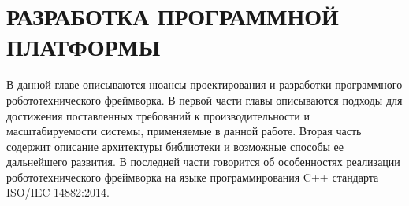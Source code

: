 \chapter{РАЗРАБОТКА ПРОГРАММНОЙ ПЛАТФОРМЫ}

В данной главе описываются нюансы проектирования и разработки программного робототехнического фреймворка. В первой части главы описываются подходы для достижения поставленных требований к производительности и масштабируемости системы, применяемые в данной работе. Вторая часть содержит описание архитектуры библиотеки и возможные способы ее дальнейшего развития. В последней части говорится об особенностях реализации робототехнического фреймворка на языке программирования C++ стандарта ISO/IEC 14882:2014.




